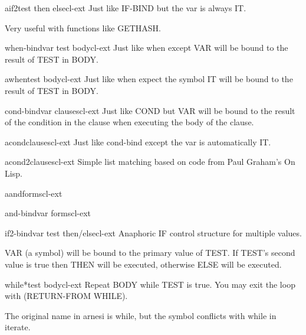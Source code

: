 \begin{macro}{aif2}{test then \op else}{cl-ext}{}
  Just like IF-BIND but the var is always IT.

Very useful with functions like GETHASH.
\end{macro}

\begin{macro}{when-bind}{var test \body body}{cl-ext}{}
  Just like when except VAR will be bound to the
  result of TEST in BODY.
\end{macro}

\begin{macro}{awhen}{test \body body}{cl-ext}{}
  Just like when expect the symbol IT will be
  bound to the result of TEST in BODY.
\end{macro}

\begin{macro}{cond-bind}{var \body clauses}{cl-ext}{}
  Just like COND but VAR will be bound to the result of the
  condition in the clause when executing the body of the clause.
\end{macro}

\begin{macro}{acond}{\rest clauses}{cl-ext}{}
  Just like cond-bind except the var is automatically IT.
\end{macro}

\begin{macro}{acond2}{\rest clauses}{cl-ext}{}
  Simple list matching based on code from Paul Graham's On Lisp.
\end{macro}

\begin{macro}{aand}{\rest forms}{cl-ext}{}
  
\end{macro}

\begin{macro}{and-bind}{var \rest forms}{cl-ext}{}
  
\end{macro}

\begin{macro}{if2-bind}{var test \body then/else}{cl-ext}{}
  Anaphoric IF control structure for multiple values.

VAR (a symbol) will be bound to the primary value of TEST.  If
TEST's second value is true then THEN will be executed, otherwise
ELSE will be executed.
\end{macro}

\begin{macro}{while*}{test \body body}{cl-ext}{}
  Repeat BODY while TEST is true. You may exit the loop with
  (RETURN-FROM WHILE).
  \begin{devnote}
    The original name in arnesi is while, but the symbol conflicts
    with while in iterate.
  \end{devnote}
\end{macro}

